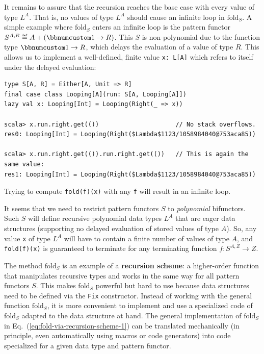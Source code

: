 It remains to assure that the recursion reaches the base case with
every value of type $L^{A}$. That is, no values of type $L^{A}$
should cause an infinite loop in $\text{fold}_{S}$. A simple example
where $\text{fold}_{S}$ enters an infinite loop is the pattern functor
$S^{A,R}\triangleq A+(\bbnum 1\rightarrow R)$. This $S$ is non-polynomial
due to the function type $\bbnum 1\rightarrow R$, which delays the
evaluation of a value of type $R$. This allows us to implement a
well-defined, finite value \lstinline!x: L[A]! which refers to itself
under the delayed evaluation:
\begin{lstlisting}
type S[A, R] = Either[A, Unit => R]
final case class Looping[A](run: S[A, Looping[A]])
lazy val x: Looping[Int] = Looping(Right(_ => x))

scala> x.run.right.get(())                     // No stack overflows.
res0: Looping[Int] = Looping(Right($Lambda$1123/1058984040@753aca85)) 

scala> x.run.right.get(()).run.right.get(())   // This is again the same value:
res1: Looping[Int] = Looping(Right($Lambda$1123/1058984040@753aca85))
\end{lstlisting}
Trying to compute \lstinline!fold(f)(x)! with any \lstinline!f!
will result in an infinite loop.

It seems that we need to restrict pattern functors $S$ to \emph{polynomial}
bifunctors. Such $S$ will define recursive polynomial data types
$L^{A}$ that are eager data structures (supporting no delayed evaluation
of stored values of type $A$). So, any value \lstinline!x! of type
$L^{A}$ will have to contain a finite number of values of type $A$,
and \lstinline!fold(f)(x)! is guaranteed to terminate for any terminating
function $f:S^{A,Z}\rightarrow Z$.

The method $\text{fold}_{S}$ is an example of a \textbf{recursion
scheme}: a higher-order function that manipulates
recursive types and works in the same way for all pattern functors
$S$. This makes $\text{fold}_{S}$ powerful but hard to use because
data structures need to be defined via the \lstinline!Fix! constructor.
Instead of working with the general function $\text{fold}_{S}$, it
is more convenient to implement and use a specialized code of $\text{fold}_{S}$
adapted to the data structure at hand. The general implementation
of $\text{fold}_{S}$ in Eq.~(\ref{eq:fold-via-recursion-scheme-1})
can be translated mechanically (in principle, even automatically using
macros or code generators) into code specialized for a given data
type and pattern functor.

